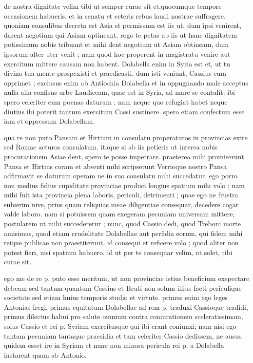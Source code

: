  de nostra dignitate velim tibi ut semper curae sit et,quocumque tempore occasionem habueris, et in senatu et ceteris rebus laudi nostrae suffragere. quoniam consulibus decreta est Asia et permissum est iis ut, dum ipsi venirent, darent negotium qui Asiam optineant, rogo te petas ab iis ut hanc dignitatem potissimum nobis tribuant et mihi dent negotium ut Asiam obtineam, dum ipsorum alter uter venit ; nam quod hoc properent in magistratu venire aut exercitum mittere causam non habent. Dolabella enim in Syria est et, ut tu divina tua mente prospexisti et praedicasti, dum isti veniunt, Cassius eum opprimet ; exclusus enim ab Antiochia Dolabella et in oppugnando male acceptus nulla alia confisus urbe Laudiceam, quae est in Syria, ad mare se contulit. ibi spero celeriter eum poenas daturum ; nam neque quo refugiat habet neque diutius ibi poterit tantum exercitum Cassi sustinere. spero etiam confectum esse iam et oppressum Dolabellam.

 qua re non puto Pansam et Hirtium in consulatu properaturos in provincias exire sed Romae acturos consulatum. itaque si ab iis petieris ut interea nobis procurationem Asiae dent, spero te posse impetrare. praeterea mihi promiserunt Pansa et Hirtius coram et absenti mihi scripserunt Verrioque nostro Pansa adfirmavit se daturum operam ne in suo consulatu mihi succedatur. ego porro non medius fidius cupiditate provinciae produci longius spatium mihi volo ; nam mihi fuit ista provincia plena laboris, periculi, detrimenti ; quae ego ne frustra subierim nive, prius quam reliquias meae diligentiae consequar, decedere cogar valde laboro. nam si potuissem quam exegeram pecuniam universam mittere, postularem ut mihi succederetur ; nunc, quod Cassio dedi, quod Treboni morte amisimus, quod etiam crudelitate Dolabellae aut perfidia eorum, qui fidem mihi reique publicae non praestiterunt, id consequi et reficere volo ; quod aliter non potest fieri, nisi spatium habuero. id ut per te consequar velim, ut solet, tibi curae sit.

 ego me de re p. puto esse meritum, ut non provinciae istius beneficium exspectare debeam sed tantum quantum Cassius et Bruti non solum illius facti periculique societate sed etiam huius temporis studio et virtute. primus enim ego leges Antonias fregi, primus equitatum Dolabellae ad rem p. traduxi Cassioque tradidi, primus dilectus habui pro salute omnium contra coniurationem sceleratissimam, solus Cassio et rei p. Syriam exercitusque qui ibi erant coniunxi; nam nisi ego tantam pecuniam tantaque praesidia et tam celeriter Cassio dedissem, ne ausus quidem esset ire in Syriam et nunc non minora pericula rei p. a Dolabella instarent quam ab Antonio.

